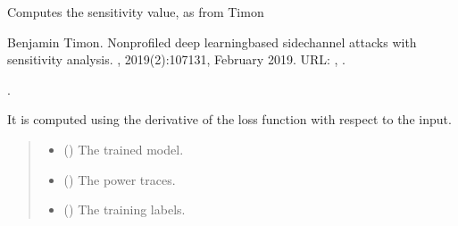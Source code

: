\documentclass[letterpaper,10pt,english]{sphinxmanual}
\begin{document}
\begin{fulllineitems}

\begin{fulllineitems}
\label{\detokenize{MLSCAlib.Attacks:MLSCAlib.Attacks.attack.Attack.get_sensitivity_tensors}}
\pysigstartsignatures
{}
\pysigstopsignatures
\sphinxAtStartPar
Computes the sensitivity value, as from Timon%
\begin{footnote}[1]\sphinxAtStartFootnote
Benjamin Timon. Non\sphinxhyphen{}profiled deep learning\sphinxhyphen{}based side\sphinxhyphen{}channel attacks with sensitivity analysis. , 2019(2):107\textendash{}131, February 2019. URL: , .
%
\end{footnote}.

\sphinxAtStartPar
It is computed using the derivative of the loss function with respect to the input.
\begin{quote}\begin{description}
\begin{itemize}
\item {} 
\sphinxAtStartPar
{} () \textendash{} The trained model.

\item {} 
\sphinxAtStartPar
{} (\sphinxstyleliteralemphasis{\sphinxupquote{{[}}}\sphinxstyleliteralemphasis{\sphinxupquote{{[}}}\sphinxstyleliteralemphasis{\sphinxupquote{{]}}}\sphinxstyleliteralemphasis{\sphinxupquote{{]}}}) \textendash{} The power traces.

\item {} 
\sphinxAtStartPar
{} (\sphinxstyleliteralemphasis{\sphinxupquote{{[}}}\sphinxstyleliteralemphasis{\sphinxupquote{{]}}}) \textendash{} The training labels.


\end{itemize}
\end{description}
\end{quote}
\end{fulllineitems}
\end{fulllineitems}
\end{document}
